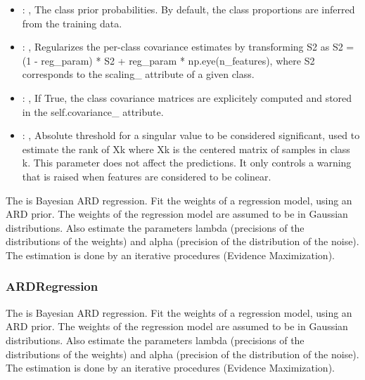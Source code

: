 \begin{itemize}
    \item {}: , 
      The class prior probabilities. By default, the class
      proportions are inferred from the training data.

    \item {}: , 
      Regularizes the per-class covariance estimates by transforming
      S2 as S2 = (1 - reg\_param) * S2 + reg\_param * np.eye(n\_features),
      where S2 corresponds to the                                                  scaling\_
      attribute of a given class.

    \item {}: , 
      If True, the class covariance matrices are explicitely
      computed and stored in the self.covariance\_ attribute.

    \item {}: , 
      Absolute threshold for a singular value to be considered
      significant, used to estimate the rank of Xk where Xk is the centered
      matrix of samples in class k. This parameter does not affect
      the predictions. It only controls a warning that is raised when
      features are considered to be colinear.
  \end{itemize}
 The  is Bayesian ARD regression.                             Fit the weights
 of a regression model, using an ARD prior. The weights of the
 regression model are assumed to be in Gaussian distributions. Also estimate the
 parameters lambda (precisions of the distributions of the weights) and
 alpha (precision of the distribution of the noise).                             The estimation is
 done by an iterative procedures (Evidence Maximization).

\subsubsection{ARDRegression}
  The  is Bayesian ARD regression.                             Fit the
  weights of a regression model, using an ARD prior. The weights of the
  regression model are assumed to be in Gaussian distributions. Also estimate the
  parameters lambda (precisions of the distributions of the weights) and
  alpha (precision of the distribution of the noise).                             The estimation is
  done by an iterative procedures (Evidence Maximization).

